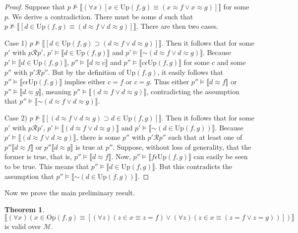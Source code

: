 \documentclass{article}
\newcommand*{\oldneg}{\mathord{\sim}}
\newcommand{\lbc}{\llbracket}
\newcommand{\rbc}{\rrbracket}
\theoremstyle{definition}
\newtheorem{theorem}{Theorem}[section]
\begin{document}
\begin{proof}
Suppose that $p\nvDash\lbc(\forall x)[x\in\textrm{Up}(f,g)\equiv (x\approx f\vee x\approx g)]\rbc$ for some $p$. We 
derive a contradiction. There must be some $d$ such that 
$p\nvDash\lbc[d\in\textrm{Up}(f,g)\equiv (d\approx f\vee d\approx g)]\rbc$. There are then two cases.

Case 1) $p\nvDash\lbc[d\in\textrm{Up}(f,g)\supset (d\approx f\vee d\approx g)]\rbc$. Then it follows that 
for some $p'$ with $p\mathcal{R}p'$, 
$p'\vDash\lbc d\in\textrm{Up}(f,g)\rbc$ and $p'\vDash\lbc\oldneg(d\approx f\vee d\approx g)\rbc$. Because 
$p'\vDash\lbc d\in\textrm{Up}(f,g)\rbc$, $p''\vDash\lbc d\approx c\rbc$ and $p''\vDash\lbc c\epsilon\textrm{Up}(f,g)\rbc$ 
for some $c$ and some $p''$ with $p'\mathcal{R}p''$. But by the definition of $\textrm{Up}(f,g)$, it easily follows that 
$p''\vDash\lbc c\epsilon\textrm{Up}(f,g)\rbc$ implies either $c=f$ or $c=g$. Thus either 
$p''\vDash\lbc d\approx f\rbc$ or $p''\vDash\lbc d\approx g\rbc$, meaning
$p''\vDash\lbc (d\approx f\vee d\approx g)\rbc$, contradicting the assumption that 
$p''\vDash\lbc\oldneg(d\approx f\vee d\approx g)\rbc$.

Case 2) $p\nvDash\lbc[(d\approx f\vee d\approx g)\supset d\in\textrm{Up}(f,g)]\rbc$. Then it follows that 
for some $p'$ with $p\mathcal{R}p'$,
$p'\vDash\lbc (d\approx f\vee d\approx g)\rbc$ and $p'\vDash\lbc\oldneg (d\in\textrm{Up}(f,g))\rbc$. 
Because $p'\vDash\lbc (d\approx f\vee d\approx g)\rbc$, there is some $p''$ with $p'\mathcal{R}p''$ such that 
at least one of $p''\lbc d\approx f\rbc$ or $p''\lbc d\approx g\rbc$ is true at $p''$. Suppose, without loss of generality, that the 
former is true, that is, $p''\vDash\lbc d\approx f\rbc$. Now, $p''\vDash\lbc f\epsilon\textrm{Up}(f,g)\rbc$ can easily be seen to be 
true. This means that $p''\vDash\lbc d\in\textrm{Up}(f,g)\rbc$. But this contradicts the assumption that 
$p''\vDash\lbc\oldneg (d\in\textrm{Up}(f,g))\rbc$.

\end{proof}

Now we prove the main preliminary result.

\begin{theorem}
\[ \lbc(\forall x)(x\in\textrm{Op}(f,g)\equiv[(\forall z)(z\in x\equiv z=f)\vee(\forall z)(z\in x\equiv (z=f\vee z=g))])\rbc \]
is valid over $\mathcal{M}$.
\end{theorem}
\end{document}
